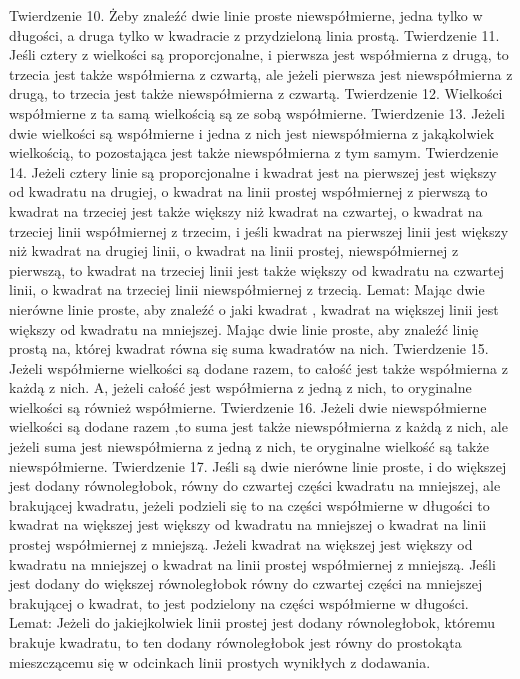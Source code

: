     Twierdzenie 10.
        Żeby znaleźć dwie linie proste niewspółmierne, jedna tylko w długości, a druga tylko w kwadracie z przydzieloną linia prostą.
    Twierdzenie 11.
        Jeśli cztery z wielkości są proporcjonalne, i pierwsza jest współmierna z drugą, to trzecia jest także współmierna z czwartą, ale jeżeli pierwsza jest niewspółmierna z drugą, to trzecia jest także niewspółmierna z czwartą.
    Twierdzenie 12.
        Wielkości współmierne z ta samą wielkością są ze sobą współmierne.
    Twierdzenie 13.
        Jeżeli dwie wielkości są współmierne i jedna z nich jest niewspółmierna z jakąkolwiek wielkością, to pozostająca jest także niewspółmierna z tym samym.
    Twierdzenie 14.
        Jeżeli cztery linie są proporcjonalne i kwadrat jest na pierwszej jest większy od kwadratu na drugiej, o kwadrat na linii prostej współmiernej z pierwszą to kwadrat na trzeciej jest także większy niż kwadrat na czwartej, o kwadrat na trzeciej linii współmiernej z trzecim, i jeśli kwadrat na pierwszej linii jest większy niż kwadrat na drugiej linii, o kwadrat na linii prostej, niewspółmiernej z pierwszą, to kwadrat na trzeciej linii jest także większy od kwadratu na czwartej linii, o kwadrat na trzeciej linii niewspółmiernej z trzecią.
        Lemat:
        Mając dwie nierówne linie proste, aby znaleźć o jaki kwadrat , kwadrat na większej linii jest większy od kwadratu na mniejszej. Mając dwie linie proste, aby znaleźć linię prostą na, której kwadrat równa się suma kwadratów na nich.
    Twierdzenie 15.
        Jeżeli współmierne wielkości są dodane razem, to całość jest także współmierna z każdą z nich. A, jeżeli całość jest współmierna z jedną z nich, to oryginalne wielkości są również współmierne.
    Twierdzenie 16.
        Jeżeli dwie niewspółmierne wielkości są dodane razem ,to suma jest także niewspółmierna z każdą z nich, ale jeżeli suma jest niewspółmierna z jedną z nich, te oryginalne wielkość są także niewspółmierne.
    Twierdzenie 17.
        Jeśli są dwie nierówne linie proste, i do większej jest dodany równoległobok, równy do czwartej części kwadratu na mniejszej, ale brakującej kwadratu, jeżeli podzieli się to na części współmierne w długości to kwadrat na większej jest większy od kwadratu na mniejszej o kwadrat na linii prostej współmiernej z mniejszą. Jeżeli kwadrat na większej jest większy od kwadratu na mniejszej o kwadrat na linii prostej współmiernej z mniejszą. Jeśli jest dodany do większej równoległobok równy do czwartej części na mniejszej brakującej o kwadrat, to jest podzielony na części współmierne w długości.
        Lemat:
        Jeżeli do jakiejkolwiek linii prostej jest dodany równoległobok, któremu brakuje kwadratu, to ten dodany równoległobok jest równy do prostokąta mieszczącemu się w odcinkach linii prostych wynikłych z dodawania.
